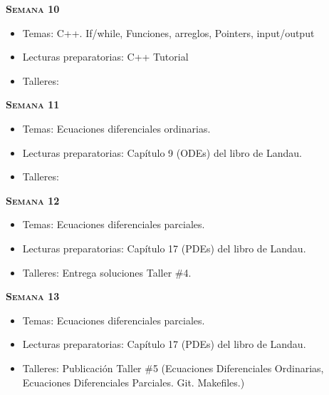 \documentclass[letterpaper,10pt,onecolumn]{article}
\begin{document}

\noindent\textbf{\textsc{Semana 10}}\\[-0.5cm]
\begin{itemize}
\item Temas: C++. If/while, Funciones, arreglos, Pointers, input/output \\[-0.6cm]
\item Lecturas preparatorias: C++ Tutorial\\[-0.6cm]
\item Talleres: 
\\[-0.6cm]
\end{itemize}


\noindent\textbf{\textsc{Semana 11}}\\[-0.5cm]
\begin{itemize}
\item Temas: Ecuaciones diferenciales ordinarias. \\[-0.6cm]
\item Lecturas preparatorias: Cap\'itulo 9 (ODEs) del libro de
  Landau. \\[-0.6cm] 
\item Talleres: 
\\[-0.6cm]
\end{itemize}

\noindent\textbf{\textsc{Semana 12}}\\[-0.5cm]
\begin{itemize}
\item Temas: Ecuaciones diferenciales parciales. \\[-0.6cm]
\item Lecturas preparatorias: Cap\'itulo 17 (PDEs) del libro de
  Landau. \\[-0.6cm] 
\item Talleres: 
Entrega soluciones Taller \#4. 
\\[-0.6cm]
\end{itemize}

\noindent\textbf{\textsc{Semana 13}}\\[-0.5cm]
\begin{itemize}
\item Temas: Ecuaciones diferenciales parciales. \\[-0.6cm]
\item Lecturas preparatorias: Cap\'itulo 17 (PDEs) del libro de
  Landau. \\[-0.6cm] 
\item Talleres: 
Publicaci\'on Taller \#5
(Ecuaciones Diferenciales Ordinarias, Ecuaciones Diferenciales
Parciales. Git. Makefiles.)
\\[-0.6cm]
\end{itemize}
\end{document}
